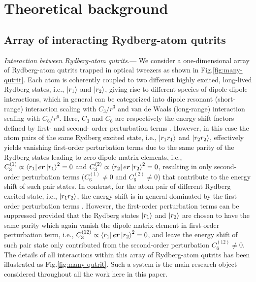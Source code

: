 \documentclass[%
 reprint,
nofootinbib,
 amsmath,amssymb,
 aps,
pra,
floatfix,
]{revtex4-2}
\begin{document}
\section{Theoretical background}

\subsection{Array of interacting Rydberg-atom qutrits}

\emph{Interaction between Rydberg-atom qutrits.}--- We consider a one-dimensional array of Rydberg-atom qutrits trapped in optical tweezers as shown in Fig.\ref{fig:many-qutrit}. Each atom is coherently coupled to two different highly excited, long-lived Rydberg states, i.e., $\ket{r_1}$ and $\ket{r_2}$, giving rise to different species of dipole-dipole interactions, which in general can be categorized into dipole resonant (short-range) interaction scaling with $C_3/r^3$ and van de Waals (long-range) interaction scaling with $C_6/r^6$. Here, $C_3$ and $C_6$ are respectively the energy shift factors defined by first- and second- order perturbation terms \cite{Saffman2010QuantumAtoms}. However, in this case the atom pairs of the same Rydberg excited state, i.e., $\ket{r_1r_1}$ and $\ket{r_2r_2}$, effectively yields vanishing first-order perturbation terms due to the same parity of the Rydberg states leading to zero dipole matrix elements, i.e., $C^{(1)}_3 \propto \bra{r_1}e\boldsymbol{r}\ket{r_1}^2 = 0$ and $C^{(2)}_3 \propto \bra{r_2}e\boldsymbol{r}\ket{r_2}^2 = 0$, resulting in only second-order perturbation terms ($C^{(1)}_6 \neq 0$ and $C^{(2)}_6 \neq 0$) that contribute to the energy shift of such pair states. In contrast, for the atom pair of different Rydberg excited state, i.e., $\ket{r_1r_2}$, the energy shift is in general dominated by the first order perturbation terms \cite{Saffman2010QuantumAtoms,Browaeys2020Many-bodyAtoms}. However, the first-order perturbation terms can be suppressed provided that the Rydberg states $\ket{r_1}$ and $\ket{r_2}$ are chosen to have the same parity which again vanish the dipole matrix element in first-order perturbation term, i.e., $C^{(12)}_3 \propto \bra{r_1}e\boldsymbol{r}\ket{r_2}^2 = 0$, and leave the energy shift of such pair state only contributed from the second-order perturbation $C^{(12)}_6 \neq 0$. The details of all interactions within this array of Rydberg-atom qutrits has been illustrated as Fig.\ref{fig:many-qutrit}. Such a system is the main research object considered throughout all the work here in this paper. 
\end{document}
